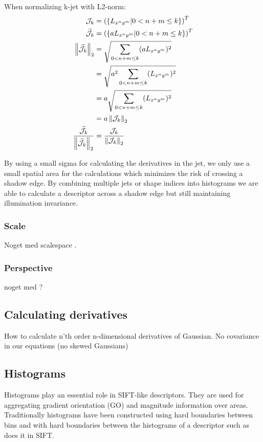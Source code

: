 \documentclass[thesis.tex]{subfiles}
\begin{document}
When normalizing k-jet with L2-norm:
\begin{align}
  \mathcal{J}_k &= \left( \left \lbrace L_{x^n y^m} | 0 < n+m \leq k \right \rbrace \right)^T \\
  \widetilde{\mathcal{J}}_k &=\left( \left \lbrace a L_{x^n y^m} | 0 < n+m \leq k \right \rbrace \right)^T \\
  \left \| \widetilde{\mathcal{J}}_k \right \|_2 &= \sqrt{\sum_{0 < n+m \leq k} (a L_{x^n y^m})^2} \\
      &= \sqrt{a^2\sum_{0 < n+m \leq k} (L_{x^n y^m})^2} \\
      &= a\sqrt{\sum_{0 < n+m \leq k} (L_{x^n y^m})^2} \\
      &= a \left \| \mathcal{J}_k \right \|_2 \\
  \frac{\widetilde{\mathcal{J}}_k}{\left \| \widetilde{\mathcal{J}}_k \right \|_2} &=
      \frac{\mathcal{J}_k}{\left \| \mathcal{J}_k \right \|_2}
\end{align}

By using a small sigma for calculating the derivatives in the jet, we only use a small spatial area for the calculations which minimizes the risk of crossing a shadow edge. By combining multiple jets or shape indices into histograms we are able to calculate a descriptor across a shadow edge but still maintaining illumination invariance.

\subsubsection{Scale}
Noget med scalespace \cite{griffin1997scale}.

\subsubsection{Perspective}
noget med ?

\subsection{Calculating derivatives}
How to calculate n'th order n-dimensional derivatives of Gaussian.
No covariance in our equations (no skewed Gaussians)

\subsection{Histograms}

Histograms play an essential role in SIFT-like descriptors. They are used for aggregating gradient orientation (GO) and magnitude information over areas. Traditionally histograms have been constructed using hard boundaries between bins and with hard boundaries between the histograms of a descriptor such as \citet{lowe2004distinctive} does it in SIFT.
\end{document}
